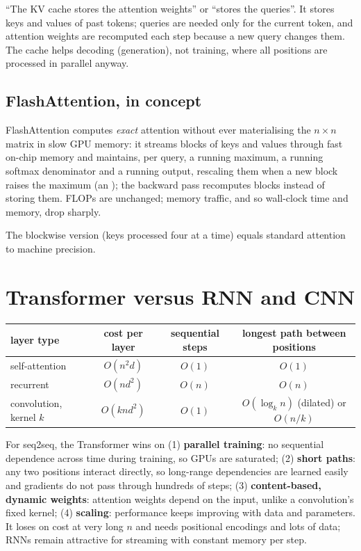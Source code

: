 \begin{remark}
	\trap ``The KV cache stores the attention weights'' or ``stores the queries''. It stores keys and values of
	past tokens; queries are needed only for the current token, and attention weights are recomputed each step
	because a new query changes them. The cache helps decoding (generation), not training, where all positions
	are processed in parallel anyway.
\end{remark}

\subsection{FlashAttention, in concept}
FlashAttention \cite{flashattn} computes \emph{exact} attention without ever materialising the $n\times n$
matrix in slow GPU memory: it streams blocks of keys and values through fast on-chip memory and maintains,
per query, a running maximum, a running softmax denominator and a running output, rescaling them when a new
block raises the maximum (an ); the backward pass recomputes blocks instead of storing
them. FLOPs are unchanged; memory traffic, and so wall-clock time and memory, drop sharply.


The blockwise version (keys processed four at a time) equals standard attention to machine precision.

\section{Transformer versus RNN and CNN}

\begin{center}
	\small
	\begin{tabular}{lccc}
		\toprule
		layer type & cost per layer & sequential steps & longest path between positions \\
		\midrule
		self-attention & $O(n^2d)$ & $O(1)$ & $O(1)$ \\
		recurrent & $O(nd^2)$ & $O(n)$ & $O(n)$ \\
		convolution, kernel $k$ & $O(knd^2)$ & $O(1)$ & $O(\log_kn)$ (dilated) or $O(n/k)$ \\
		\bottomrule
	\end{tabular}
\end{center}
For seq2seq, the Transformer wins on (1) \textbf{parallel training}: no sequential dependence across time
during training, so GPUs are saturated; (2) \textbf{short paths}: any two positions interact directly, so
long-range dependencies are learned easily and gradients do not pass through hundreds of steps; (3)
\textbf{content-based, dynamic weights}: attention weights depend on the input, unlike a convolution's fixed
kernel; (4) \textbf{scaling}: performance keeps improving with data and parameters. It loses on cost at very
long $n$ and needs positional encodings and lots of data; RNNs remain attractive for streaming with constant
memory per step.

